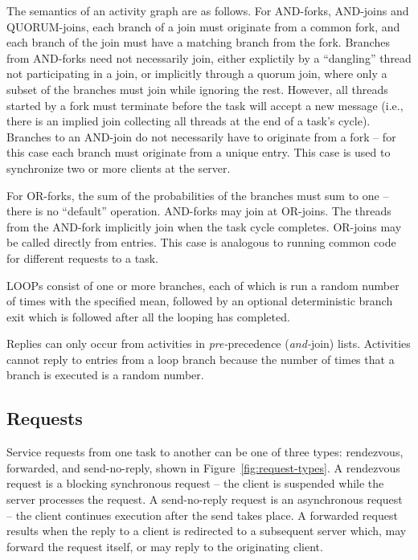 The semantics of an activity graph are
as follows.  For AND-forks, AND-joins and QUORUM-joins,
each branch of a join must originate from a common fork, and each
branch of the join must have a matching branch from the fork.
Branches from AND-forks need not necessarily join, either explictily by a ``dangling''
thread not participating in a join, or implicitly through a quorum 
join, where only  a subset of the branches must join while ignoring
the rest. However, all threads started by a fork must terminate before the task
will accept a new message (i.e., there is an implied join collecting
all threads at the end of a task's cycle).  Branches to an AND-join do
not necessarily have to originate from a fork -- for this case each
branch must originate from a unique entry.  This case is used to
synchronize
two or more clients at the server.

For OR-forks, the sum of the
probabilities of
the branches must sum to one -- there is no ``default'' operation.
AND-forks may join at OR-joins.  The threads from the
AND-fork implicitly join when the task cycle completes.  OR-joins may
be called directly from entries.  This case is analogous to running
common code for different requests to a task.

LOOPs consist of one or more
branches, each of which is
run a random number of times with the specified mean, followed by an
optional deterministic branch
exit which is followed after all the looping has
completed.

Replies can only occur from activities in
\emph{pre-}precedence (\emph{and-}join) lists.  Activities cannot
reply to entries from a loop branch because the number of times that a
branch is executed is a random number.

\subsection{Requests}
\label{sec:requests}

Service requests from one task to another can be
one of three types: rendezvous,
forwarded, and send-no-reply,
shown in Figure~\ref{fig:request-types}.  A rendezvous request is a
blocking synchronous request -- the client is suspended while the
server processes the request.  A send-no-reply request is an
asynchronous request -- the client continues execution after the send
takes place.  A forwarded request results when the reply to a client
is redirected to a subsequent server which, may forward the request
itself, or may reply to the originating client.

